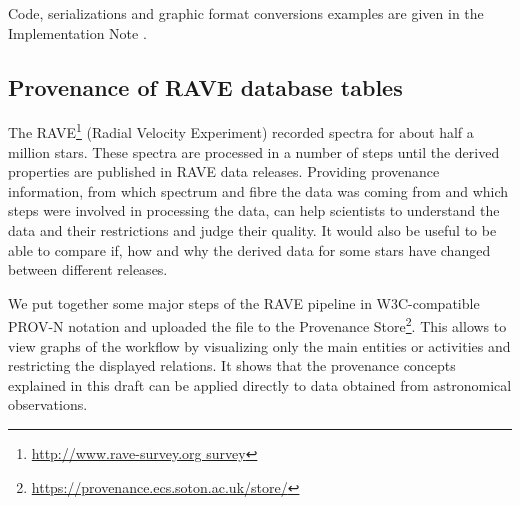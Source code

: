 Code, serializations and graphic format conversions examples are given in the Implementation Note \citep{std:ProvenanceImplementationNote}.

%
%

\subsection{Provenance of RAVE database tables}
The RAVE\footnote{\url{http://www.rave-survey.org survey}} (Radial Velocity Experiment) recorded spectra for about half a 
million stars. These spectra are processed in a number of steps until the 
derived properties are published in RAVE data releases.
Providing provenance information, from which spectrum and fibre the
data was coming from and which steps were involved in processing the data, can help scientists
to understand the data and their restrictions and judge their quality.
It would also be useful to be able to compare if, how and why the derived data for some stars have changed between different releases.

We put together some major steps of the RAVE pipeline in W3C-compatible PROV-N notation
and uploaded the file to the Provenance Store\footnote{\url{https://provenance.ecs.soton.ac.uk/store/}}. This allows to view graphs of the workflow by visualizing only the main entities or activities and restricting the displayed relations. It shows that the provenance concepts explained in this draft can be applied directly to data obtained from astronomical observations.

